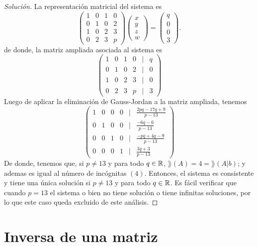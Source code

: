 \documentclass[a4,11pt]{aleph-notas}
\begin{document}
\begin{proof}[Solución]\hspace{0pt}
    La representación matricial del sistema es
    \[
    \begin{pmatrix}
                1&0&1&0\\0&1&0&2\\1&0&2&3\\0&2&3&p
                \end{pmatrix}
                \begin{pmatrix}
                x \\ y\\ z \\ w
                \end{pmatrix}
                =
                \begin{pmatrix}
                q \\ 0\\ 0\\ 3
                \end{pmatrix}.
    \]
    de donde, la matriz ampliada asociada al sistema es
    \[
                \begin{pmatrix}
                1&0&1&0&|&q\\
                0&1&0&2&|& 0\\
                1&0&2&3&|& 0\\
                0&2&3&p&|& 3
                \end{pmatrix} 
    \]
    Luego de aplicar la eliminación de Gauss-Jordan a la matriz ampliada, tenemos 
    \[
                \begin{pmatrix}
                1&0&0&0&|&\frac{2pq-17q+9}{p-13}\\
                0&1&0&0&|& \frac{-6q-6}{p-13}\\
                0&0&1&0&|& \frac{-pq+4q-9}{p-13}\\
                0&0&0&1&|& \frac{3q+3}{p-13}
                \end{pmatrix} 
    \]
    De donde, tenemos que, si $p \neq 13$ y para todo $q \in \mathbb{R}$, $\rang(A)=4 = \rang(A|b)$; y ademas es igual al número de incógnitas $(4)$. Entonces, el sistema es consistente y tiene una única solución si $p \neq 13$ y para todo $q \in \mathbb{R}$. Es fácil verificar que cuando $p=13$ el sistema o bien no tiene solución o tiene infinitas soluciones, por lo que este caso queda excluido de este análisis.
\end{proof}


\section{Inversa de una matriz}
\end{document}
